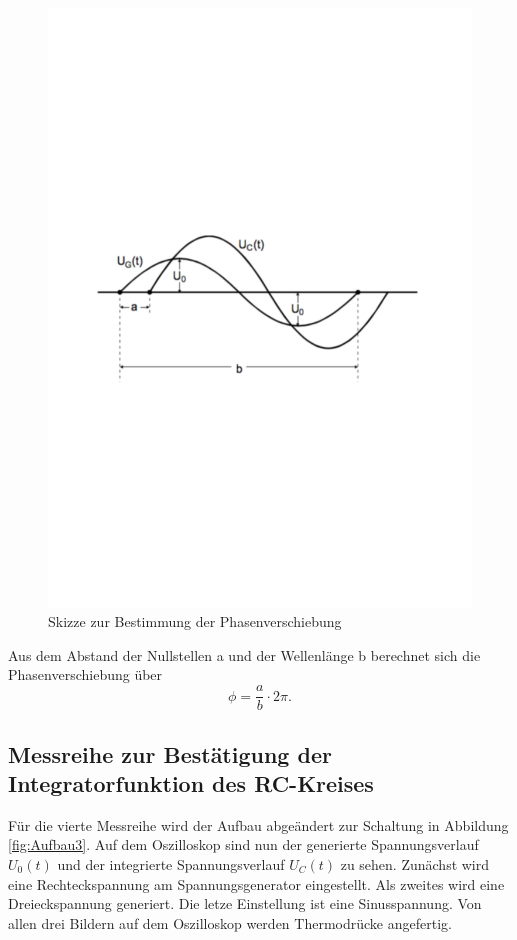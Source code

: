 \begin{figure}[h!]
  \centering
  \includegraphics[width=\textwidth]{Phasenverschiebung.pdf}
  \caption{Skizze zur Bestimmung der Phasenverschiebung \cite{1}}
  \label{fig:Phasenverschiebung}
\end{figure}

Aus dem Abstand der Nullstellen a und der Wellenlänge b berechnet sich die Phasenverschiebung \phi über
\begin{equation}
  \phi = \frac{a}{b} \cdot 2 \pi.
\label{eqn:phasenverschiebung}
\end{equation}


\subsection{Messreihe zur Bestätigung der Integratorfunktion des RC-Kreises}
Für die vierte Messreihe wird der Aufbau abgeändert zur Schaltung in Abbildung \ref{fig:Aufbau3}.
Auf dem Oszilloskop sind nun der generierte Spannungsverlauf $U_{0}(t)$ und der integrierte Spannungsverlauf $U_{C}(t)$ zu sehen.
Zunächst wird eine Rechteckspannung am Spannungsgenerator eingestellt.
Als zweites wird eine Dreieckspannung generiert.
Die letze Einstellung ist eine Sinusspannung.
Von allen drei Bildern auf dem Oszilloskop werden Thermodrücke angefertig.

